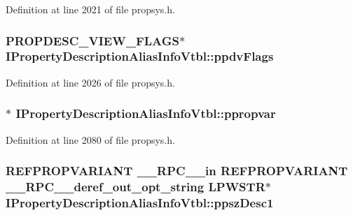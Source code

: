Definition at line 2021 of file propsys.\+h.

\subsubsection[{\texorpdfstring{ppdv\+Flags}{ppdvFlags}}]{ {\bf P\+R\+O\+P\+D\+E\+S\+C\+\_\+\+V\+I\+E\+W\+\_\+\+F\+L\+A\+GS}$\ast$ I\+Property\+Description\+Alias\+Info\+Vtbl\+::ppdv\+Flags}\hypertarget{struct_i_property_description_alias_info_vtbl_a5e18a19c9654b913ce21fe7537c485b2}{}\label{struct_i_property_description_alias_info_vtbl_a5e18a19c9654b913ce21fe7537c485b2}


Definition at line 2026 of file propsys.\+h.

\subsubsection[{\texorpdfstring{ppropvar}{ppropvar}}]{$\ast$ I\+Property\+Description\+Alias\+Info\+Vtbl\+::ppropvar}\hypertarget{struct_i_property_description_alias_info_vtbl_a9e66742960c77ffcb2c8fe3941f9418f}{}\label{struct_i_property_description_alias_info_vtbl_a9e66742960c77ffcb2c8fe3941f9418f}


Definition at line 2080 of file propsys.\+h.

\subsubsection[{\texorpdfstring{ppsz\+Desc1}{ppszDesc1}}]{ {\bf R\+E\+F\+P\+R\+O\+P\+V\+A\+R\+I\+A\+NT} {\bf \+\_\+\+\_\+\+R\+P\+C\+\_\+\+\_\+in} {\bf R\+E\+F\+P\+R\+O\+P\+V\+A\+R\+I\+A\+NT} {\bf \+\_\+\+\_\+\+R\+P\+C\+\_\+\+\_\+deref\+\_\+out\+\_\+opt\+\_\+string} {\bf L\+P\+W\+S\+TR}$\ast$ I\+Property\+Description\+Alias\+Info\+Vtbl\+::ppsz\+Desc1}\hypertarget{struct_i_property_description_alias_info_vtbl_a473c66d5e4c9e23dfcc89270587e9045}{}\label{struct_i_property_description_alias_info_vtbl_a473c66d5e4c9e23dfcc89270587e9045}


